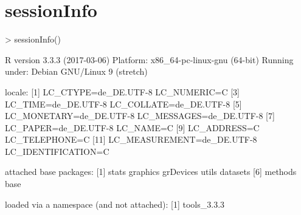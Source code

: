 \documentclass[letterpaper]{article}
\begin{document}


\section{sessionInfo}

\begin{Schunk}
\begin{Sinput}
> sessionInfo()
\end{Sinput}
\begin{Soutput}
R version 3.3.3 (2017-03-06)
Platform: x86_64-pc-linux-gnu (64-bit)
Running under: Debian GNU/Linux 9 (stretch)

locale:
 [1] LC_CTYPE=de_DE.UTF-8       LC_NUMERIC=C              
 [3] LC_TIME=de_DE.UTF-8        LC_COLLATE=de_DE.UTF-8    
 [5] LC_MONETARY=de_DE.UTF-8    LC_MESSAGES=de_DE.UTF-8   
 [7] LC_PAPER=de_DE.UTF-8       LC_NAME=C                 
 [9] LC_ADDRESS=C               LC_TELEPHONE=C            
[11] LC_MEASUREMENT=de_DE.UTF-8 LC_IDENTIFICATION=C       

attached base packages:
[1] stats     graphics  grDevices utils     datasets 
[6] methods   base     

loaded via a namespace (and not attached):
[1] tools_3.3.3
\end{Soutput}
\end{Schunk}
\end{document}
